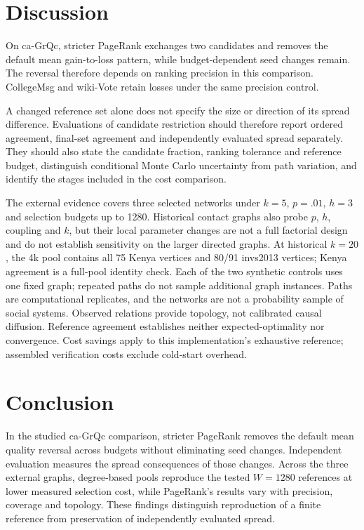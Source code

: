 \documentclass[smallextended]{svjour3}
\begin{document}
\section{Discussion}
On ca-GrQc, stricter PageRank exchanges two candidates and removes the default mean gain-to-loss pattern, while budget-dependent seed changes remain. The reversal therefore depends on ranking precision in this comparison. CollegeMsg and wiki-Vote retain losses under the same precision control.

A changed reference set alone does not specify the size or direction of its spread difference. Evaluations of candidate restriction should therefore report ordered agreement, final-set agreement and independently evaluated spread separately. They should also state the candidate fraction, ranking tolerance and reference budget, distinguish conditional Monte Carlo uncertainty from path variation, and identify the stages included in the cost comparison.

The external evidence covers three selected networks under $k=5$, $p=.01$, $h=3$ and selection budgets up to 1280. Historical contact graphs also probe $p$, $h$, coupling and $k$, but their local parameter changes are not a full factorial design and do not establish sensitivity on the larger directed graphs. At historical $k=20$, the 4k pool contains all 75 Kenya vertices and 80/91 invs2013 vertices; Kenya agreement is a full-pool identity check. Each of the two synthetic controls uses one fixed graph; repeated paths do not sample additional graph instances. Paths are computational replicates, and the networks are not a probability sample of social systems. Observed relations provide topology, not calibrated causal diffusion. Reference agreement establishes neither expected-optimality nor convergence. Cost savings apply to this implementation's exhaustive reference; assembled verification costs exclude cold-start overhead.

\section{Conclusion}
In the studied ca-GrQc comparison, stricter PageRank removes the default mean quality reversal across budgets without eliminating seed changes. Independent evaluation measures the spread consequences of those changes. Across the three external graphs, degree-based pools reproduce the tested $W=1280$ references at lower measured selection cost, while PageRank's results vary with precision, coverage and topology. These findings distinguish reproduction of a finite reference from preservation of independently evaluated spread.
\end{document}

